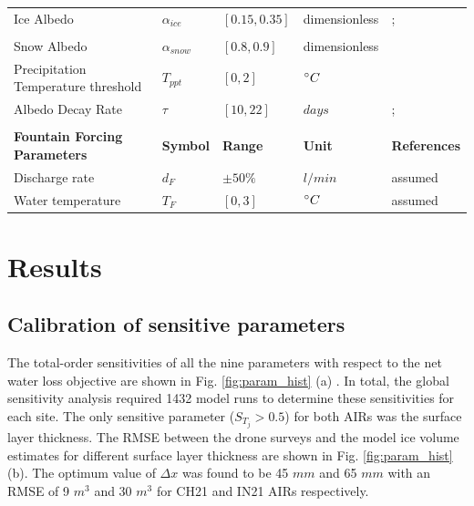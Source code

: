 \documentclass[utf8]{frontiersSCNS}
\begin{document}
\begin{table}
\begin{tabular}{lllll}
    Ice Albedo                          & $\alpha_{ice}$        & $[0.15,0.35]$         & dimensionless  &
    \citeauthor{steiner_2015};            \\
    & &    &  & \citeauthor{ZollesMaussion_2019}      \\
    Snow Albedo                         & $\alpha_{snow}$       & $[0.8,0.9]$        & dimensionless  & \citeauthor{ZollesMaussion_2019}              \\
    Precipitation Temperature threshold & $T_{ppt}$             & $[0,2]$            & $\degree C$& \citeauthor{Zhou_2010}  \\
    Albedo Decay Rate                   & $\tau$                & $[10,22]$           & $days$ &
    \citeauthor{Schmidt_2017};      \\
    & &    &  & \citeauthor{OerlemansKnap_1998}      \\\midrule
		\textbf{Fountain Forcing Parameters} & \textbf{Symbol} & \textbf{Range} & \textbf{Unit} & \textbf{References} \\
    Discharge rate & $d_{F}$             & $\pm 50 \%$            & $l/min$& assumed  \\
    Water temperature & $T_{F}$             & $[0,3]$            & $\degree C$  & assumed  \\\bottomrule
	\end{tabular}
\end{table}

\section{Results}

\subsection{Calibration of sensitive parameters}

The total-order sensitivities of all the nine parameters with respect to the net water loss objective are shown
in Fig. \ref{fig:param_hist} (a) . In total, the global sensitivity analysis required 1432 model runs to determine
these sensitivities for each site. The only sensitive parameter ($S_{T_{j}} > 0.5$) for both AIRs was the
surface layer thickness. The RMSE between the drone surveys and the model ice volume estimates for different
surface layer thickness are shown in Fig. \ref{fig:param_hist} (b). The optimum value of $\Delta x$ was found to
be 45 $mm$ and 65 $mm$ with an RMSE of 9 $m^3$ and 30 $m^3$ for CH21 and IN21 AIRs respectively.
\end{document}
